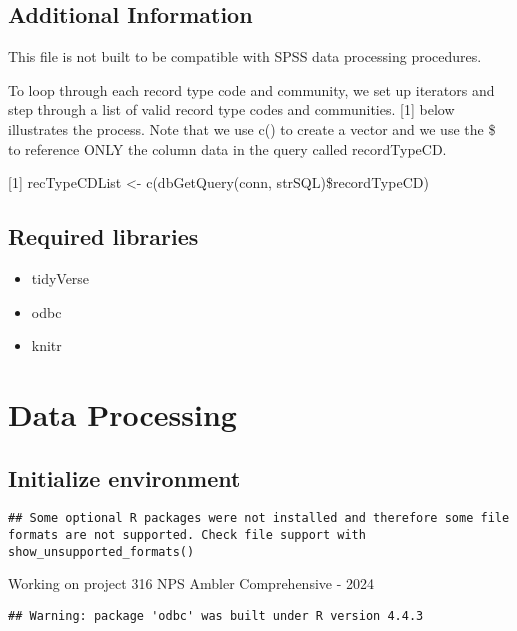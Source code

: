\documentclass[
]{article}
\providecommand{\tightlist}{%
  \setlength{\itemsep}{0pt}\setlength{\parskip}{0pt}}
\begin{document}
\subsection{Additional Information}\label{additional-information}

This file is not built to be compatible with SPSS data processing
procedures.

To loop through each record type code and community, we set up iterators
and step through a list of valid record type codes and communities.
{[}1{]} below illustrates the process. Note that we use c() to create a
vector and we use the \$ to reference ONLY the column data in the query
called recordTypeCD.

{[}1{]} recTypeCDList \textless- c(dbGetQuery(conn,
strSQL)\$recordTypeCD)

\subsection{Required libraries}\label{required-libraries}

\begin{itemize}
\tightlist
\item
  tidyVerse\\
\item
  odbc\\
\item
  knitr
\end{itemize}

\section{Data Processing}\label{data-processing}

\subsection{Initialize environment}\label{initialize-environment}

\begin{verbatim}
## Some optional R packages were not installed and therefore some file formats are not supported. Check file support with show_unsupported_formats()
\end{verbatim}

Working on project 316 NPS Ambler Comprehensive - 2024

\begin{verbatim}
## Warning: package 'odbc' was built under R version 4.4.3
\end{verbatim}
\end{document}
